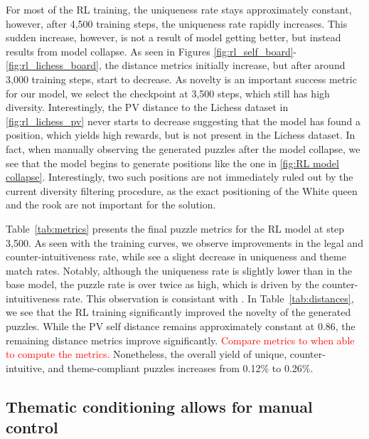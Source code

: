 \documentclass[letterpaper]{article} %
\begin{document}
For most of the RL training, the uniqueness rate stays approximately constant, however, after 4,500 training steps, the uniqueness rate rapidly increases. This sudden increase, however, is not a result of model getting better, but instead results from model collapse. As seen in Figures \ref{fig:rl_self_board}-\ref{fig:rl_lichess_board}, the distance metrics initially increase, but after around 3,000 training steps, start to decrease. As novelty is an important success metric for our model, we select the checkpoint at 3,500 steps, which still has high diversity. Interestingly, the PV distance to the Lichess dataset in \ref{fig:rl_lichess_pv} never starts to decrease suggesting that the model has found a position, which yields high rewards, but is not present in the Lichess dataset. In fact, when manually observing the generated puzzles after the model collapse, we see that the model begins to generate positions like the one in \ref{fig:RL model collapse}. Interestingly, two such positions are not immediately ruled out by the current diversity filtering procedure, as the exact positioning of the White queen and the rook are not important for the solution.


Table~\ref{tab:metrics} presents the final puzzle metrics for the RL model at step 3,500. As seen with the training curves, we observe improvements in the legal and counter-intuitiveness rate, while see a slight decrease in uniqueness and theme match rates. Notably, although the uniqueness rate is slightly lower than in the base model, the puzzle rate is over twice as high, which is driven by the counter-intuitiveness rate. This observation is consistant with \cite{feng2025generatingcreativechesspuzzles}. In Table~\ref{tab:distances}, we see that the RL training significantly improved the novelty of the generated puzzles. While the PV self distance remains approximately constant at 0.86, the remaining distance metrics improve significantly. \textcolor{red}{Compare metrics to \cite{feng2025generatingcreativechesspuzzles} when able to compute the metrics.} Nonetheless, the overall yield of unique, counter-intuitive, and theme-compliant puzzles increases from 0.12\% to 0.26\%.





\subsection{Thematic conditioning allows for manual control}
\end{document}
